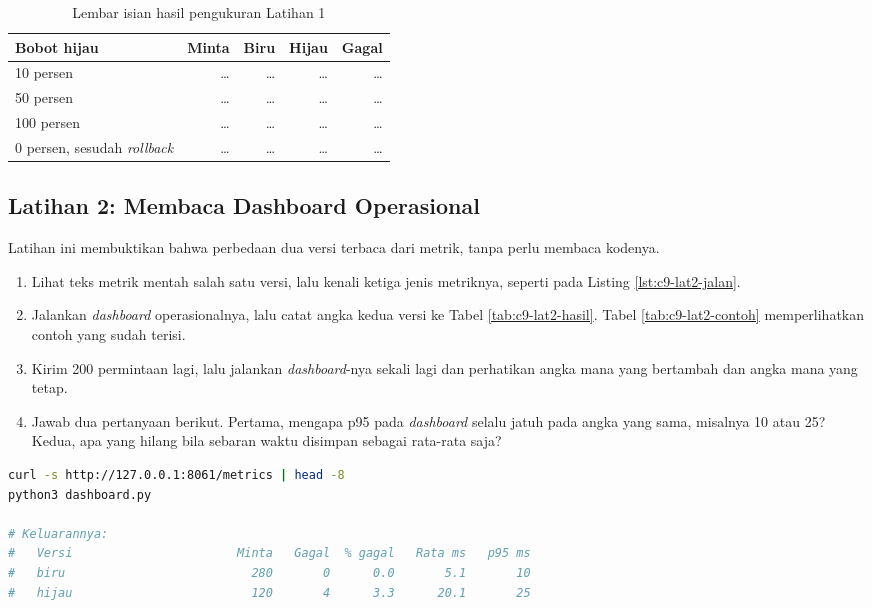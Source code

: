 \begin{table}[!htb]
  \centering
  \caption{Lembar isian hasil pengukuran Latihan 1}
  \label{tab:c9-lat1-hasil}
  \begin{tabularx}{\textwidth}{Xrrrr}
    \hline
    \textbf{Bobot hijau} & \textbf{Minta} & \textbf{Biru} & \textbf{Hijau} & \textbf{Gagal} \\
    \hline
    10 persen & \dots & \dots & \dots & \dots \\
    \hline
    50 persen & \dots & \dots & \dots & \dots \\
    \hline
    100 persen & \dots & \dots & \dots & \dots \\
    \hline
    0 persen, sesudah \textit{rollback} & \dots & \dots & \dots & \dots \\
    \hline
  \end{tabularx}
\end{table}

\subsection*{Latihan 2: Membaca Dashboard Operasional}

Latihan ini membuktikan bahwa perbedaan dua versi terbaca dari metrik, tanpa
perlu membaca kodenya.

\begin{enumerate}
  \item Lihat teks metrik mentah salah satu versi, lalu kenali ketiga jenis
        metriknya, seperti pada Listing \ref{lst:c9-lat2-jalan}.
  \item Jalankan \textit{dashboard} operasionalnya, lalu catat angka kedua versi ke Tabel \ref{tab:c9-lat2-hasil}. Tabel \ref{tab:c9-lat2-contoh}
        memperlihatkan contoh yang sudah terisi.
  \item Kirim 200 permintaan lagi, lalu jalankan \textit{dashboard}-nya sekali lagi dan
        perhatikan angka mana yang bertambah dan angka mana yang tetap.
  \item Jawab dua pertanyaan berikut. Pertama, mengapa p95 pada \textit{dashboard} selalu
        jatuh pada angka yang sama, misalnya 10 atau 25? Kedua, apa yang
        hilang bila sebaran waktu disimpan sebagai rata-rata saja?
\end{enumerate}

\begin{lstlisting}[language=bash, caption={Membaca metrik mentah lalu \textit{dashboard}-nya, tersedia di \berkas{sources/chapter09/dashboard.py}}, label={lst:c9-lat2-jalan}]
curl -s http://127.0.0.1:8061/metrics | head -8
python3 dashboard.py

# Keluarannya:
#   Versi                       Minta   Gagal  % gagal   Rata ms   p95 ms
#   biru                          280       0      0.0       5.1       10
#   hijau                         120       4      3.3      20.1       25
\end{lstlisting}

